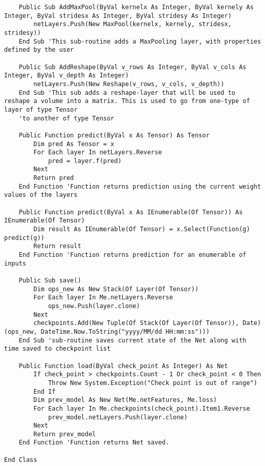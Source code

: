 \begin{verbatim}
    Public Sub AddMaxPool(ByVal kernelx As Integer, ByVal kernely As Integer, ByVal stridesx As Integer, ByVal stridesy As Integer)
        netLayers.Push(New MaxPool(kernelx, kernely, stridesx, stridesy))
    End Sub 'This sub-routine adds a MaxPooling layer, with properties defined by the user

    Public Sub AddReshape(ByVal v_rows As Integer, ByVal v_cols As Integer, ByVal v_depth As Integer)
        netLayers.Push(New Reshape(v_rows, v_cols, v_depth))
    End Sub 'This sub adds a reshape-layer that will be used to reshape a volume into a matrix. This is used to go from one-type of layer of type Tensor
    'to another of type Tensor

    Public Function predict(ByVal x As Tensor) As Tensor
        Dim pred As Tensor = x
        For Each layer In netLayers.Reverse
            pred = layer.f(pred)
        Next
        Return pred
    End Function 'Function returns prediction using the current weight values of the layers

    Public Function predict(ByVal x As IEnumerable(Of Tensor)) As IEnumerable(Of Tensor)
        Dim result As IEnumerable(Of Tensor) = x.Select(Function(g) predict(g))
        Return result
    End Function 'Function returns prediction for an enumerable of inputs

    Public Sub save()
        Dim ops_new As New Stack(Of Layer(Of Tensor))
        For Each layer In Me.netLayers.Reverse
            ops_new.Push(layer.clone)
        Next
        checkpoints.Add(New Tuple(Of Stack(Of Layer(Of Tensor)), Date)(ops_new, DateTime.Now.ToString("yyyy/MM/dd HH:mm:ss")))
    End Sub 'sub-routine saves current state of the Net along with time saved to checkpoint list

    Public Function load(ByVal check_point As Integer) As Net
        If check_point > checkpoints.Count - 1 Or check_point < 0 Then
            Throw New System.Exception("Check point is out of range")
        End If
        Dim prev_model As New Net(Me.netFeatures, Me.loss)
        For Each layer In Me.checkpoints(check_point).Item1.Reverse
            prev_model.netLayers.Push(layer.clone)
        Next
        Return prev_model
    End Function 'Function returns Net saved.

End Class

\end{verbatim}